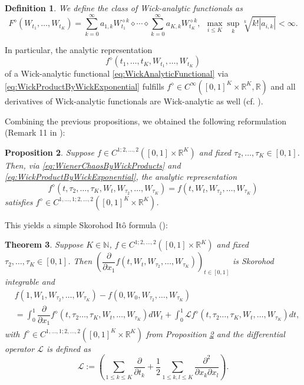 \documentclass[a4paper,11pt,reqno]{amsart}
\theoremstyle{plain}
\newtheorem{theorem}{Theorem}
\newtheorem{definition}[theorem]{Definition}
\newtheorem{proposition}[theorem]{Proposition}
\def\N{\mathbb{N}}
\def\R{\mathbb{R}}
\numberwithin{equation}{section}
\begin{document}
\begin{definition}\label{def_Wick_analytic_functionals}
We define the class of \emph{Wick-analytic functionals} as 
\begin{equation}\label{eq:WickAnalyticFunctional}
F^{\diamond}(W_{t_1}, \ldots, W_{t_K}) = \sum\limits_{k=0}^{\infty}a_{1,k} W_{t_1}^{\diamond k} \diamond \cdots \diamond \sum\limits_{k=0}^{\infty} a_{K,k} W_{t_K}^{\diamond k}, \ \  \max_{i \leq K}\sup\limits_{k} \sqrt[k]{k! |a_{i,k}|}  < \infty. 
\end{equation}
\end{definition}
In particular, the analytic representation 
$$
f^{\diamond}(t_1,\ldots, t_K, W_{t_1}, \ldots, W_{t_K})
$$
of a Wick-analytic functional \eqref{eq:WickAnalyticFunctional} via \eqref{eq:WickProductByWickExponential} fulfills $f^{\diamond} \in C^{\infty}([0,1]^K\times \R^{K},\R)$ and all derivatives of Wick-analytic functionals are Wick-analytic as well (cf. \cite[Proposition 10]{NP}).

Combining the previous propositions, we obtained the following reformulation (Remark 11 in \cite{NP}):

\begin{proposition}\label{prop:AnalyticRepresentation}
Suppose $f \in C^{1;2,\ldots, 2}([0,1]\times \R^{K})$ and fixed  $\tau_2, \ldots, \tau_K \in [0,1]$. Then, via \eqref{eq:WienerChaosByWickProducts} and \eqref{eq:WickProductByWickExponential}, the analytic representation
\[
f^{\diamond}(t, \tau_2, \ldots, \tau_K,W_{t}, W_{\tau_2},\ldots, W_{\tau_K}) = f(t,W_{t}, W_{\tau_2},\ldots, W_{\tau_K})
\]
satisfies $f^{\diamond} \in C^{1,\ldots, 1; 2,\ldots, 2}([0,1]^K\times \R^{K})$. 
\end{proposition}

This yields a simple Skorohod It\^o formula (\cite[Theorem 15]{NP}):

\begin{theorem}\label{theorem:SkorohodItoFormula}
Suppose $K \in \N$, $f \in C^{1;2,\ldots, 2}([0,1]\times \R^{K})$ and fixed  $\tau_2, \ldots, \tau_K \in [0,1]$. Then $\left(\dfrac{\partial}{\partial x_1}f(t,W_{t}, W_{\tau_2},\ldots, W_{\tau_K})\right)_{t \in [0,1]}$ is Skorohod integrable and 
\begin{align}
&f(1,W_{1}, W_{\tau_2},\ldots, W_{\tau_K}) - f(0,W_{0}, W_{\tau_2},\ldots, W_{\tau_K})\nonumber\\ &=\int_{0}^{1}\dfrac{\partial}{\partial x_1} f^{\diamond}(t, \tau_2\ldots, \tau_K,W_{t}, \ldots, W_{\tau_K}) dW_{t} + \int_{0}^{1} \mathcal{L} f^{\diamond}(t, \tau_2\ldots, \tau_K,W_{t}, \ldots, W_{\tau_K})dt,\label{eq_thm_Ito_formula_Skorohod}
\end{align}
with $f^{\diamond} \in C^{1,\ldots, 1; 2,\ldots, 2}([0,1]^K\times \R^{K})$ from Proposition \ref{prop:AnalyticRepresentation} and the differential operator $\mathcal{L}$ is defined as
\begin{equation}\label{eq_L_operator}
\mathcal{L}:= \left(\sum_{1\leq k \leq K}\dfrac{\partial}{\partial t_k} + \frac{1}{2} \sum_{1\leq k,l \leq K} \dfrac{\partial^2}{\partial x_k \partial x_l}\right).  
\end{equation}
\end{theorem}
\end{document}
